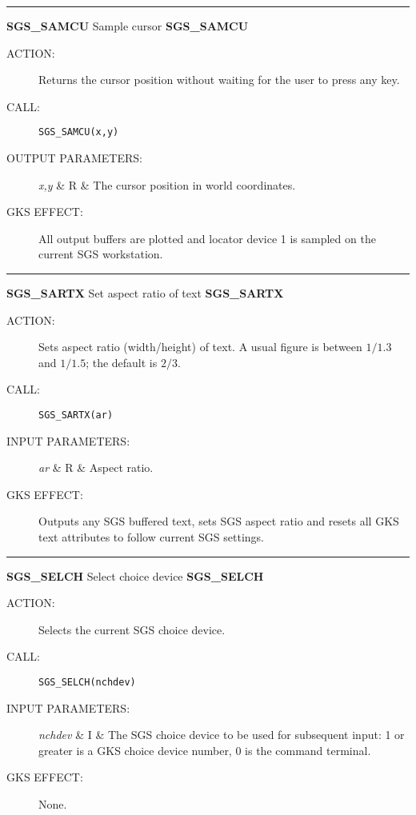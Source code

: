 \rule{\textwidth}{0.3mm}
{\Large {\bf SGS\_SAMCU} \hfill Sample cursor \hfill {\bf SGS\_SAMCU}}
\begin{description}
\item [ACTION:]
Returns the cursor position without waiting for the user to press any key.
\item [CALL:]
{\tt SGS\_SAMCU(x,y)}
\item [OUTPUT PARAMETERS:]
\begin{params}
{\em x,y}  & R  & The cursor position in world coordinates.
\end{params}
\item [GKS EFFECT:]
All output buffers are plotted and locator device 1 is sampled on the
current SGS workstation.
\end{description}
\goodbreak

\rule{\textwidth}{0.3mm}
{\Large {\bf SGS\_SARTX} \hfill Set aspect ratio of text \hfill {\bf SGS\_SARTX}}
\begin{description}
\item [ACTION:]
Sets aspect ratio (width/height) of text.
A usual figure is between $1/1.3$ and $1/1.5$; the default is $2/3$.
\item [CALL:]
{\tt SGS\_SARTX(ar)}
\item [INPUT PARAMETERS:]
\begin{params}
{\em ar}  & R  & Aspect ratio.
\end{params}
\item [GKS EFFECT:]
Outputs any SGS buffered text, sets SGS aspect ratio and resets all GKS text
attributes to follow current SGS settings.
\end{description}
\goodbreak

\rule{\textwidth}{0.3mm}
{\Large {\bf SGS\_SELCH} \hfill Select choice device \hfill {\bf SGS\_SELCH}}
\begin{description}
\item [ACTION:]
Selects the current SGS choice device.
\item [CALL:]
{\tt SGS\_SELCH(nchdev)}
\item [INPUT PARAMETERS:]
\begin{params}
{\em nchdev}  & I  & The SGS choice device to be used for subsequent input:
1 or greater is a GKS choice device number, 0 is the command terminal.
\end{params}
\item [GKS EFFECT:]
None.
\end{description}
\goodbreak

